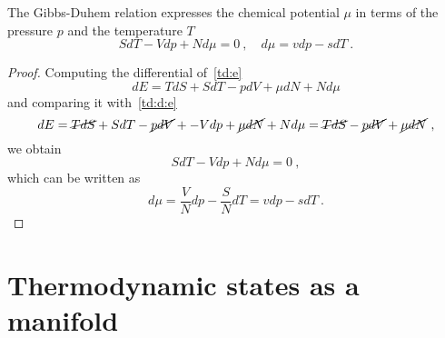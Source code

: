     The Gibbs-Duhem relation expresses the chemical potential $\mu$ in terms of the pressure $p$ and the temperature $T$ 
    \begin{equation}\label{td:gd}
        S dT - Vdp + N d\mu = 0 ~, \quad d \mu = v dp - s dT ~.
    \end{equation}
    \begin{proof}
        Computing the differential of~\eqref{td:e} 
        \begin{equation*}
            dE = T dS + S dT -p dV + \mu dN + N d\mu 
        \end{equation*}
        and comparing it with~\eqref{td:d:e}
        \begin{equation*}
            dE = \cancel{T dS} + S dT - \cancel{p dV} + - V dp + \cancel{\mu dN} + N d\mu = \cancel{T dS} - \cancel{p dV} + \cancel{\mu dN} ~,
        \end{equation*}
        we obtain 
        \begin{equation*}
            S dT - V dp + N d\mu = 0 ~,
        \end{equation*}
        which can be written as 
        \begin{equation*}
            d \mu = \frac{V}{N} dp - \frac{S}{N} dT = v dp - s dT ~.
        \end{equation*}
    \end{proof}

\section{Thermodynamic states as a manifold}

